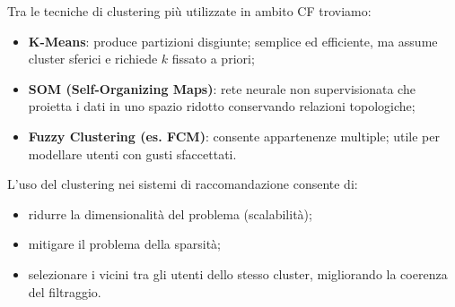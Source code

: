 Tra le tecniche di clustering più utilizzate in ambito CF troviamo:

\begin{itemize}
    \item \textbf{K-Means}: produce partizioni disgiunte; semplice ed efficiente, ma assume cluster sferici e richiede $k$ fissato a priori;
    \item \textbf{SOM (Self-Organizing Maps)}: rete neurale non supervisionata che proietta i dati in uno spazio ridotto conservando relazioni topologiche;
    \item \textbf{Fuzzy Clustering (es. FCM)}: consente appartenenze multiple; utile per modellare utenti con gusti sfaccettati.
\end{itemize}

L’uso del clustering nei sistemi di raccomandazione consente di:
\begin{itemize}
    \item ridurre la dimensionalità del problema (scalabilità);
    \item mitigare il problema della sparsità;
    \item selezionare i vicini tra gli utenti dello stesso cluster, migliorando la coerenza del filtraggio.
\end{itemize}
